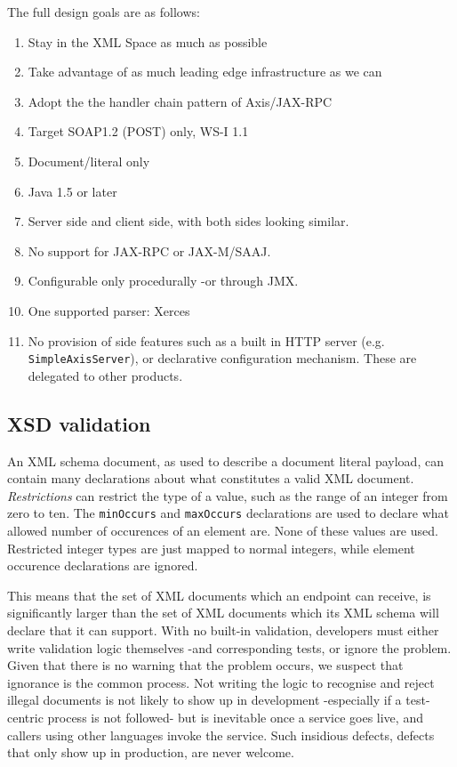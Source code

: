 The full design goals are as follows:

\begin{enumerate}

\item Stay in the XML Space as much as possible
\item Take advantage of as much leading edge infrastructure as we can
\item Adopt the the handler chain pattern of Axis/JAX-RPC
\item Target SOAP1.2 (POST) only, WS-I 1.1
\item Document/literal only
\item Java 1.5 or later 
\item Server side and client side, with both sides looking similar. 
\item No support for JAX-RPC or JAX-M/SAAJ.
\item Configurable only procedurally -or through JMX. 
\item One supported parser: Xerces

\item No provision of side features such as a built in HTTP server (e.g.
\verb|SimpleAxisServer|), or declarative configuration mechanism.
These are delegated to other products.
\end{enumerate}

\subsection{XSD validation}
\label{alpine:validation}

An XML schema document, as used to describe a document literal
payload, can contain many declarations about what constitutes a valid
XML document. \emph{Restrictions} can restrict the type of a value,
such as the range of an integer from zero to ten. The \verb|minOccurs|
and \verb|maxOccurs| declarations are used to declare what allowed
number of occurences of an element are. None of these values are
used. Restricted integer types are just mapped to normal integers,
while element occurence declarations are ignored.

This means that the set of XML documents which an endpoint can
receive, is significantly larger than the set of XML documents which
its XML schema will declare that it can support. With no built-in
validation, developers must either write validation logic themselves
-and corresponding tests, or ignore the problem. Given that there is
no warning that the problem occurs, we suspect that ignorance is the
common process. Not writing the logic to recognise and reject illegal
documents is not likely to show up in development -especially if a
test-centric process is not followed- but is inevitable once a service
goes live, and callers using other languages invoke the service. Such
insidious defects, defects that only show up in production, are never
welcome.

